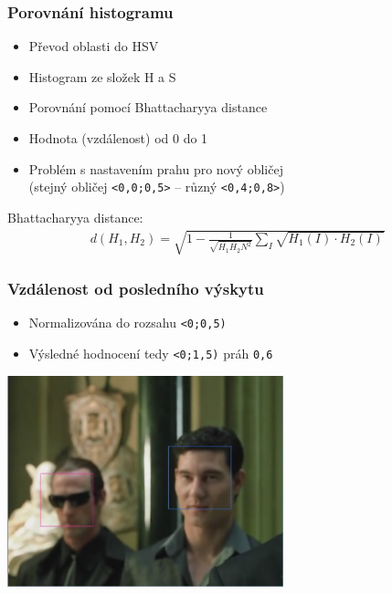 \documentclass{beamer}
\begin{document}
	\begin{frame}[t,fragile]
		\frametitle{Porovnání histogramu}	
		
		\begin{itemize}
			\item Převod oblasti do HSV
			\item Histogram ze složek H a S
			\item Porovnání pomocí Bhattacharyya distance
			\item Hodnota (vzdálenost) od 0 do 1 
			\item Problém s nastavením prahu pro nový obličej\\
			 (stejný obličej \verb|<0,0;0,5>| -- různý \verb|<0,4;0,8>|)
		\end{itemize}		
		
		Bhattacharyya distance: 
\begin{align}
d(H_{1},H_{2})=\sqrt{1-\frac{1}{\sqrt{\overline{H_{1}}\overline{H_{2}}N^2}}\sum\limits_{I}\sqrt{H_{1}(I) \cdot H_{2}(I)}}
\end{align}

	\end{frame}				
	
	\begin{frame}[t,fragile]
		\frametitle{Vzdálenost od posledního výskytu}	
		
		\begin{itemize}
			\item Normalizována do rozsahu \verb|<0;0,5)|
			\item Výsledné hodnocení tedy \verb|<0;1,5)| práh \verb|0,6|
		\end{itemize}
		\centering\includegraphics[width=8cm]{img/Persons.jpg}
		
					
	\end{frame}			
	
\end{document}
